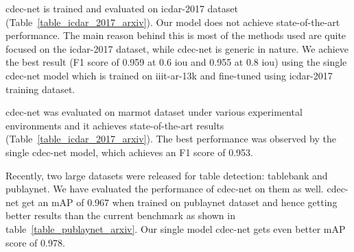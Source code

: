 \documentclass[a4paper,conference]{IEEEtran}
\begin{document}
{\sc cd}e{\sc c-n}et is trained and evaluated on {\sc icdar-2017} dataset (Table~\ref{table_icdar_2017_arxiv}). Our model does not achieve state-of-the-art performance. The main reason behind this is most of the methods used are quite focused on the {\sc icdar-2017} dataset, while {\sc cd}e{\sc c-n}et is generic in nature. We achieve the best result (F1 score of 0.959 at 0.6 {\sc i}o{\sc u} and 0.955 at 0.8 {\sc i}o{\sc u}) using the single {\sc cd}e{\sc c-n}et model which is trained on {\sc iiit-ar-13k} and fine-tuned using {\sc icdar-2017} training dataset.

{\sc cd}e{\sc c-n}et was evaluated on {\sc m}armot dataset under various experimental environments and it achieves state-of-the-art results (Table~\ref{table_icdar_2017_arxiv}). The best performance was observed by the single {\sc cd}e{\sc c-n}et model, which achieves an F1 score of 0.953.

Recently, two large datasets were released for table detection: {\sc t}able{\sc b}ank and {\sc p}ub{\sc l}ay{\sc n}et. We have evaluated the performance of {\sc cd}e{\sc c-n}et on them as well. {\sc cd}e{\sc c-n}et get an mAP of 0.967 when trained on {\sc p}ub{\sc l}ay{\sc n}et dataset and hence getting better results than the current benchmark as shown in table~\ref{table_publaynet_arxiv}. Our single model {\sc cd}e{\sc c-n}et gets even better mAP score of 0.978.
\end{document}

